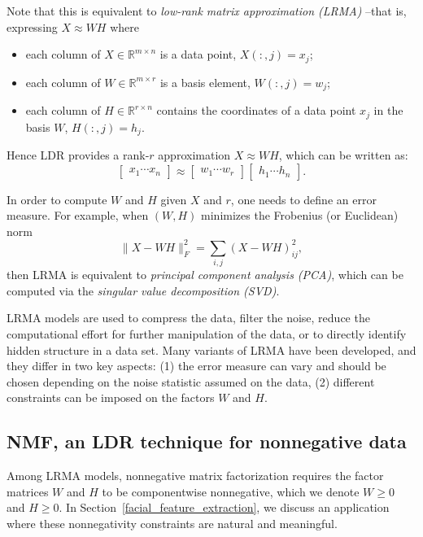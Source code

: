 \documentclass{amsart}
\newcommand{\R}{\mathbb{R}}
\begin{document}
Note that this is equivalent to {\it low-rank matrix approximation (LRMA)} --that is, expressing $X \approx WH$ where
\begin{itemize}
    \item each column of $X\in\R^{m\times n}$ is a data point, $X(:,j)=x_j$;
    \item each column of $W\in\R^{m\times r}$ is a basis element, $W(:,j)=w_j$;
    \item each column of $H\in\R^{r\times n}$ contains the coordinates of a data point $x_j$ in the basis $W$, $H(:,j)=h_j$.
\end{itemize}
Hence LDR provides a rank-$r$ approximation $X\approx WH$, which can be written as:
\[
    \begin{bmatrix} x_1 \cdots x_n \end{bmatrix} \approx
    \begin{bmatrix} w_1 \cdots w_r \end{bmatrix}
    \begin{bmatrix} h_1 \cdots h_n \end{bmatrix}.
\]

\bigskip

In order to compute $W$ and $H$ given $X$ and $r$, one needs to define an error measure. For example, when $(W,H)$ minimizes the Frobenius (or Euclidean) norm
\[  
    \|X-WH\|_F^2 = \sum_{i,j} (X-WH)_{ij}^2,
\]
then LRMA is equivalent to {\it principal component analysis (PCA)}, which can be computed via the {\it singular value decomposition (SVD)}.

\bigskip

LRMA models are used to compress the data, filter the noise, reduce the computational effort for further manipulation of the data, or to directly identify hidden structure in a data set. Many variants of LRMA have been developed, and they differ in two key aspects: (1) the error measure can vary and should be chosen depending on the noise statistic assumed on the data,
(2) different constraints can be imposed on the factors $W$ and $H$.

\subsection{NMF, an LDR technique for nonnegative data}

Among LRMA models, nonnegative matrix factorization requires the factor matrices $W$ and $H$ to be componentwise nonnegative, which we denote $W\geq 0$ and $H\geq 0$. In Section~\ref{facial_feature_extraction}, we discuss an application where these nonnegativity constraints are natural and meaningful.
\end{document}
